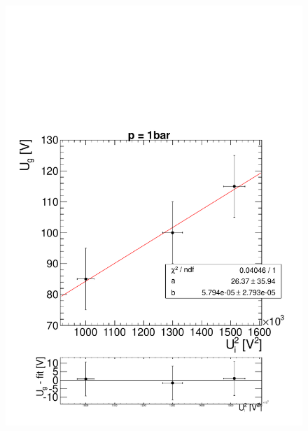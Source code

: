 \documentclass[a4paper,12pt]{article}
\begin{document}
\begin{figure}[htb]
		\includegraphics[height = 0.3\textheight]{linRegLuft2.pdf}\\

\end{figure}
\end{document}
